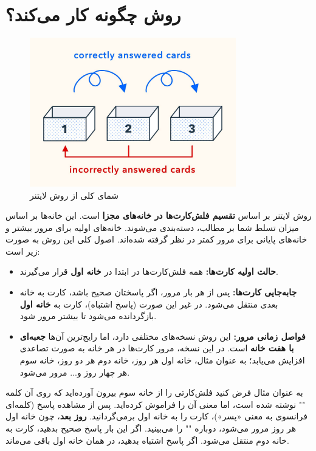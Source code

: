 \documentclass[12pt]{report}
\begin{document}
\section{روش  چگونه کار می‌کند؟}

\begin{figure}[h!]
  \centering
  \includegraphics[width=0.8\textwidth]{images/leitner-overview.png}
  \caption{شمای کلی از روش لایتنر}
  \label{fig:leitner-overview}
\end{figure}

روش لایتنر بر اساس \textbf{تقسیم فلش‌کارت‌ها در خانه‌های مجزا} است. این خانه‌ها بر اساس میزان تسلط شما بر مطالب، دسته‌بندی می‌شوند. خانه‌های اولیه برای مرور بیشتر و خانه‌های پایانی برای مرور کمتر در نظر گرفته شده‌اند. اصول کلی این روش به صورت زیر است:


\begin{itemize}
    \item \textbf{حالت اولیه کارت‌ها:} همه فلش‌کارت‌ها در ابتدا در \textbf{خانه اول} قرار می‌گیرند.
    \item \textbf{جابه‌جایی کارت‌ها:} پس از هر بار مرور، اگر پاسختان صحیح باشد، کارت به خانه بعدی منتقل می‌شود. در غیر این صورت (پاسخ اشتباه)، کارت به \textbf{خانه اول} بازگردانده می‌شود تا بیشتر مرور شود.
    \item \textbf{فواصل زمانی مرور:} این روش نسخه‌های مختلفی دارد، اما رایج‌ترین آن‌ها \textbf{جعبه‌ای با هفت خانه} است. در این نسخه، مرور کارت‌ها در هر خانه به صورت تصاعدی افزایش می‌یابد؛ به عنوان مثال، خانه اول هر روز، خانه دوم هر دو روز، خانه سوم هر چهار روز و... مرور می‌شود.
\end{itemize}

به عنوان مثال فرض کنید فلش‌کارتی را از خانه سوم بیرون آورده‌اید که روی آن کلمه "" نوشته شده است، اما معنی آن را فراموش کرده‌اید. پس از مشاهده پاسخ (کلمه‌ای فرانسوی به معنی «پسر»)، کارت را به خانه اول برمی‌گردانید. \textbf{روز بعد}، چون خانه اول هر روز مرور می‌شود، دوباره "" را می‌بینید. اگر این بار پاسخ صحیح بدهید، کارت به خانه دوم منتقل می‌شود. اگر پاسخ اشتباه بدهید، در همان خانه اول باقی می‌ماند.
\end{document}
